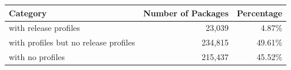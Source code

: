 \small
\begin{tabular}{@{}lrr@{}}
    \toprule
    \textbf{Category} & \textbf{Number of Packages} & \textbf{Percentage} \\
    \midrule
    with release profiles & 23{,}039 & 4.87\% \\
    with profiles but no release profiles & 234{,}815 & 49.61\% \\
    with no profiles & 215{,}437 & 45.52\% \\
    \bottomrule
\end{tabular}
